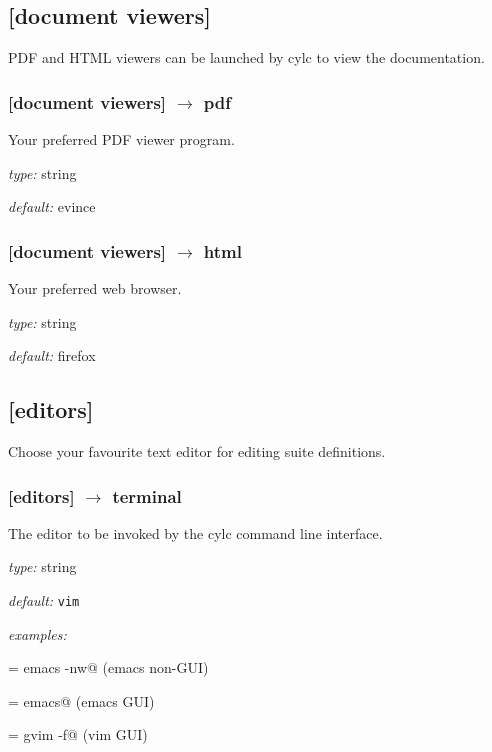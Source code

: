 \subsection{[document viewers]}

PDF and HTML viewers can be launched by cylc to view the documentation.

\subsubsection[pdf]{[document viewers] $\rightarrow$ pdf}

Your preferred PDF viewer program.

\begin{myitemize}
\item {\em type:} string
\item {\em default:} evince
\end{myitemize}

\subsubsection[html]{[document viewers] $\rightarrow$ html}

Your preferred web browser.

\begin{myitemize}
\item {\em type:} string
\item {\em default:} firefox
\end{myitemize}

\subsection{[editors]}

Choose your favourite text editor for editing suite definitions.

\subsubsection[terminal]{[editors] $\rightarrow$ terminal}

The editor to be invoked by the cylc command line interface.

\begin{myitemize}
\item {\em type:} string
\item {\em default:} \lstinline=vim=
\item {\em examples:}
    \begin{myitemize}
            \item \lstinline@terminal = emacs -nw@ (emacs non-GUI)
            \item \lstinline@terminal = emacs@ (emacs GUI)
            \item \lstinline@terminal = gvim -f@ (vim GUI)
    \end{myitemize}
\end{myitemize}

